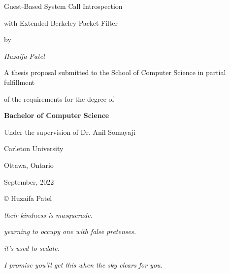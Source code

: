 \documentclass{report}
\begin{document}
\titleformat{\chapter}{}{}{0em}{\bf\LARGE}


\centerline{\Huge Guest-Based System Call Introspection}
\vspace{3mm}
\centerline{\Huge with Extended Berkeley Packet Filter}
\vspace{14mm}
\centerline{\large by}
\vspace{15mm}
\centerline{\itshape \large Huzaifa Patel}
\vspace{2cm}
\centerline{\large A thesis proposal submitted to the School of Computer Science in partial fulfillment}
\vspace{2mm}
\centerline{\large of the requirements for the degree of}
\vspace{2cm}
\centerline{\bf \large Bachelor of Computer Science}
\vspace{3cm}
\centerline{\large Under the supervision of Dr. Anil Somayaji}
\vspace{3mm}
\centerline{\large Carleton University}
\vspace{3mm}
\centerline{\large Ottawa, Ontario}
\vspace{3mm}
\centerline{\large September, 2022}
\vspace{3cm}
\centerline{\large \copyright {} Huzaifa Patel}



\newpage
\pagebreak
\hspace{0pt}
\vfill
\centerline{\itshape \large their kindness is masquerade.}
\vspace{3mm}
\centerline{\itshape \large yearning to occupy one with false pretenses.}
\vspace{3mm}
\centerline{\itshape \large it's used to sedate.}
\vspace{3mm}
\centerline{\itshape \large I promise you'll get this when the sky clears for you.}
\vfill
\hspace{0pt}
\pagebreak
\end{document}

